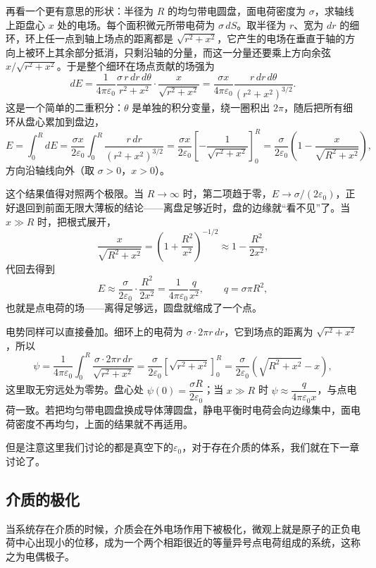 \documentclass[UTF8]{ctexbook}
\begin{document}
再看一个更有意思的形状：半径为 $R$ 的均匀带电圆盘，面电荷密度为 $\sigma$，求轴线上距盘心 $x$ 处的电场。每个面积微元所带电荷为 $\sigma\,dS$。取半径为 $r$、宽为 $dr$ 的细环，环上任一点到轴上场点的距离都是 $\sqrt{r^2+x^2}$，它产生的电场在垂直于轴的方向上被环上其余部分抵消，只剩沿轴的分量，而这一分量还要乘上方向余弦 $x/\sqrt{r^2+x^2}$。于是整个细环在场点贡献的场强为
\[
dE
=\frac{1}{4\pi\varepsilon_0}\frac{\sigma\, r\,dr\,d\theta}{r^2+x^2}\cdot\frac{x}{\sqrt{r^2+x^2}}
=\frac{\sigma x}{4\pi \varepsilon_0}\frac{r\,dr\,d\theta}{(r^2+x^2)^{3/2}}.
\]
这是一个简单的二重积分：$\theta$ 是单独的积分变量，绕一圈积出 $2\pi$，随后把所有细环从盘心累加到盘边，
\[
E=\int_0^{R} dE
=\frac{\sigma x}{2\varepsilon_0}\int_0^{R}\frac{r\,dr}{(r^2+x^2)^{3/2}}
=\frac{\sigma x}{2\varepsilon_0}\left[-\frac{1}{\sqrt{r^2+x^2}}\right]_{0}^{R}
=\frac{\sigma}{2\varepsilon_0}\left(1-\frac{x}{\sqrt{R^2+x^2}}\right),
\]
方向沿轴线向外（取 $\sigma>0$，$x>0$）。

这个结果值得对照两个极限。当 $R\to\infty$ 时，第二项趋于零，$E\to\sigma/(2\varepsilon_0)$，正好退回到前面无限大薄板的结论——离盘足够近时，盘的边缘就“看不见”了。当 $x\gg R$ 时，把根式展开，
\[
\frac{x}{\sqrt{R^2+x^2}}=\left(1+\frac{R^2}{x^2}\right)^{-1/2}\approx 1-\frac{R^2}{2x^2},
\]
代回去得到
\[
E\approx\frac{\sigma}{2\varepsilon_0}\cdot\frac{R^2}{2x^2}
=\frac{1}{4\pi\varepsilon_0}\frac{q}{x^2},\qquad q=\sigma\pi R^2,
\]
也就是点电荷的场——离得足够远，圆盘就缩成了一个点。

电势同样可以直接叠加。细环上的电荷为 $\sigma\cdot 2\pi r\,dr$，它到场点的距离为 $\sqrt{r^2+x^2}$，所以
\[
\psi=\frac{1}{4\pi\varepsilon_0}\int_0^R\frac{\sigma\cdot 2\pi r\,dr}{\sqrt{r^2+x^2}}
=\frac{\sigma}{2\varepsilon_0}\left[\sqrt{r^2+x^2}\right]_{0}^{R}
=\frac{\sigma}{2\varepsilon_0}\left(\sqrt{R^2+x^2}-x\right),
\]
这里取无穷远处为零势。盘心处 $\psi(0)=\dfrac{\sigma R}{2\varepsilon_0}$；当 $x\gg R$ 时 $\psi\approx\dfrac{q}{4\pi\varepsilon_0 x}$，与点电荷一致。若把均匀带电圆盘换成导体薄圆盘，静电平衡时电荷会向边缘集中，面电荷密度不再均匀，上面的结果就不再适用。



但是注意这里我们讨论的都是真空下的$\varepsilon_0$，对于存在介质的体系，我们就在下一章讨论了。

\subsection{介质的极化}


当系统存在介质的时候，介质会在外电场作用下被极化，微观上就是原子的正负电荷中心出现小的位移，成为一个两个相距很近的等量异号点电荷组成的系统，这称之为电偶极子。
\end{document}

